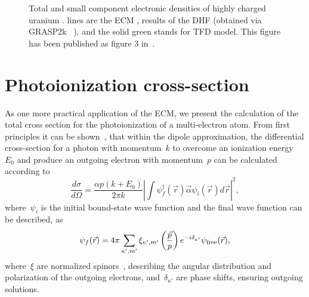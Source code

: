 \begin{figure}
  \centering  
  \caption{Total and small component electronic
    densities of highly charged uranium .  lines are the 
  ECM ,   results of the DHF  (obtained via GRASP2k
   ~\cite{jonsson_new_2013, DYALL1989425}),  and the solid green stands for TFD model. This figure has been published as figure 3 in~\cite{Dzikowski_2021}.}
  \label{fig:HCI}
\end{figure}

\section{Photoionization cross-section}
\label{sec:photo-ionis-cross}	

As one more practical application of the ECM, we
present the calculation of the total cross section for the
photoionization of a multi-electron atom. From first principles it can
be shown~\cite{PhysRev.134.A898}, that within the dipole approximation,
the differential cross-section for a photon with momentum~$k$ to
overcome an ionization energy~$E_0$ and produce an outgoing electron
with momentum~$p$ can be calculated according to
\cite{mikhailov1969relativistic}
\begin{equation}\label{PICformula}
  \frac{d \sigma}{d \Omega} = \frac{\alpha p (k+E_0)}{2 \pi k}
  \left|\int \psi^{\dagger}_f(\vec
    r)\vec{\alpha}\psi_i(\vec r) d\vec{r}\right|^2,
\end{equation}
where~$\psi_i$ is the initial bound-state wave function and the final
wave function can be described, as
\begin{equation}
  \psi_f(\vec r) = 4\pi \sum_{\kappa',m'}
  \xi_{\kappa',m'}\left(\frac{\vec{p}}{p}\right)e^{-i
    \delta_{\kappa'}}\psi_{\rm free}(\vec r),
\end{equation}
where~$\xi$ are normalized spinors~\cite{lifshitz1974relativistic},
describing the angular distribution and polarization of the outgoing
electrons, and~$\delta_{\kappa'}$ are phase shifts, ensuring outgoing
solutions.


